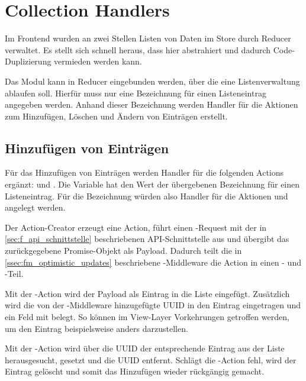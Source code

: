 \section{Collection Handlers}
\label{sec:f_collection_handlers}

Im Frontend wurden an zwei Stellen Listen von Daten im Store durch Reducer
verwaltet.  Es stellt sich schnell heraus, dass hier abstrahiert und dadurch
Code-Duplizierung vermieden werden kann.

Das Modul  kann in Reducer eingebunden werden, über
die eine Listenverwaltung ablaufen soll.  Hierfür muss nur eine Bezeichnung für
einen Listeneintrag angegeben werden.  Anhand dieser Bezeichnung werden Handler
für die Aktionen zum Hinzufügen, Löschen und Ändern von Einträgen erstellt.

\subsection{Hinzufügen von Einträgen}
\label{ssec:fc_hinzufuegen_von_eintraegen}

Für das Hinzufügen von Einträgen werden Handler für die folgenden Actions
ergänzt:  und .
Die Variable  hat den Wert der übergebenen Bezeichnung für einen
Listeneintrag.  Für die Bezeichnung  würden also Handler für die
Aktionen  und  angelegt
werden.

Der Action-Creator erzeugt eine  Action, führt einen
-Request mit der in \cref{sec:f_api_schnittstelle} beschriebenen
API-Schnittstelle aus und übergibt das zurückgegebene Promise-Objekt als
Payload.  Dadurch teilt die in \cref{ssec:fm_optimistic_updates} beschriebene
-Middleware die Action in einen - und
-Teil.

Mit der -Action wird der Payload als Eintrag in die Liste
eingefügt.  Zusätzlich wird die von der -Middleware
hinzugefügte UUID in den Eintrag eingetragen und ein Feld  mit
 belegt.  So können im View-Layer Vorkehrungen getroffen werden,
um den Eintrag beispielsweise anders darzustellen.

Mit der -Action wird über die UUID der entsprechende Eintrag
aus der Liste herausgesucht,   gesetzt und die UUID
entfernt.  Schlägt die -Action fehl, wird der Eintrag gelöscht
und somit das Hinzufügen wieder rückgängig gemacht.

